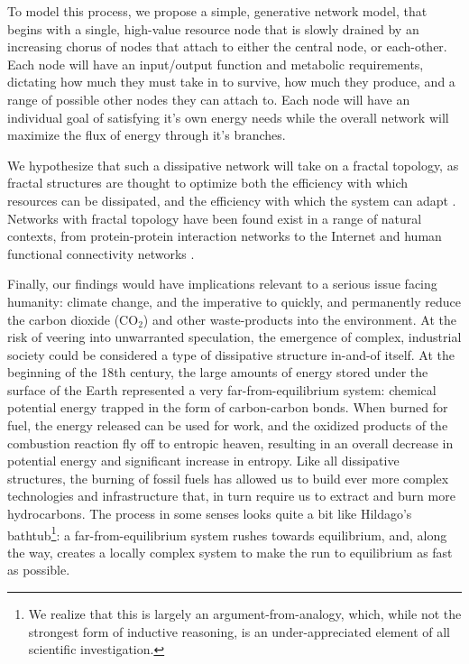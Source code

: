 \documentclass{paper}
\begin{document}
	To model this process, we propose a simple, generative network model, that begins with a single, high-value resource node that is slowly drained by an increasing chorus of nodes that attach to either the central node, or each-other. Each node will have an input/output function and metabolic requirements, dictating how much they must take in to survive, how much they produce, and a range of possible other nodes they can attach to. Each node will have an individual goal of satisfying it's own energy needs while the overall network will maximize the flux of energy through it's branches. 
	
	We hypothesize that such a dissipative network will take on a fractal topology, as fractal structures are thought to optimize both the efficiency with which resources can be dissipated, and the efficiency with which the system can adapt \cite{seely_fractal_2012}. Networks with fractal topology have been found exist in a range of natural contexts, from protein-protein interaction networks to the Internet \cite{song_self-similarity_2005,song_how_2007} and human functional connectivity networks \cite{gallos_small_2012}. 
	
	Finally, our findings would have implications relevant to a serious issue facing humanity: climate change, and the imperative to quickly, and permanently reduce the carbon dioxide (CO$_{2}$) and other waste-products into the environment. At the risk of veering into unwarranted speculation, the emergence of complex, industrial society could be considered a type of dissipative structure in-and-of itself. At the beginning of the 18th century, the large amounts of energy stored under the surface of the Earth represented a very far-from-equilibrium system: chemical potential energy trapped in the form of carbon-carbon bonds. When burned for fuel, the energy released can be used for work, and the oxidized products of the combustion reaction fly off to entropic heaven, resulting in an overall decrease in potential energy and significant increase in entropy. Like all dissipative structures, the burning of fossil fuels has allowed us to build ever more complex technologies and infrastructure that, in turn require us to extract and burn more hydrocarbons. The process in some senses looks quite a bit like Hildago's bathtub\cite{hidalgo_why_2015}\footnote{
		We realize that this is largely an argument-from-analogy, which, while not the strongest form of inductive reasoning, is an under-appreciated element of all scientific investigation.}:
	a far-from-equilibrium system rushes towards equilibrium, and, along the way, creates a locally complex system to make the run to equilibrium as fast as possible. 
	
\end{document}
